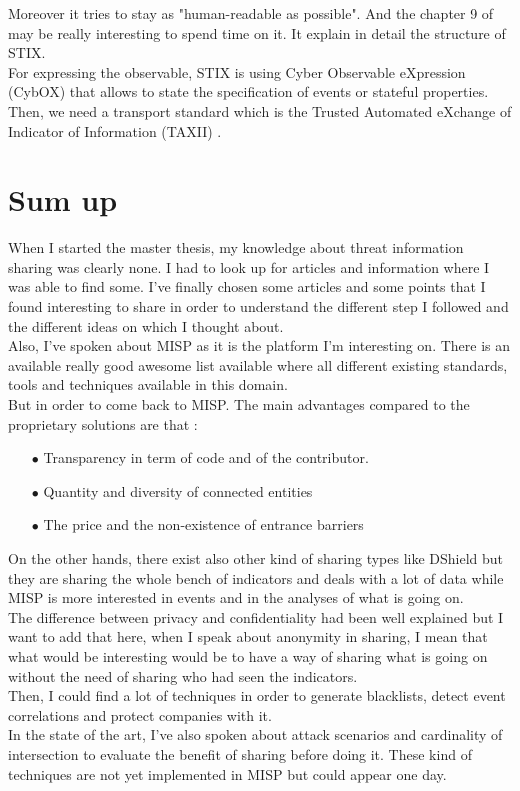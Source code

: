 \documentclass{eplmastersthesis}
\begin{document}
 Moreover it tries to stay as "human-readable as possible". And the chapter 9 of \cite{barnum2012standardizing} may be really interesting to spend time on it. It explain in detail the structure of STIX.\\
 For expressing the observable, STIX is using Cyber Observable eXpression (CybOX)\cite{barnum2012cybox} that allows to state the specification of events or stateful properties.
Then, we need a transport standard which is the Trusted Automated eXchange of Indicator of Information (TAXII) \cite{connolly2014trusted} .

\section{Sum up}
When I started the master thesis, my knowledge about threat information sharing was clearly none. I had to look up for articles and information where I was able to find some. I've finally chosen some articles and some points that I found interesting to share in order to understand the different step I followed and the different ideas on which I thought about.\\
Also, I've spoken about MISP as it is the platform I'm interesting on. There is an available really good awesome list \cite{AwesomeTreat} available where all different existing standards, tools and techniques available in this domain.\\
But in order to come back to MISP. The main advantages compared to the proprietary solutions are that :
\begin{itemize}
\item[$\bullet$] Transparency in term of code and of the contributor.
\item[$\bullet$] Quantity and diversity of connected entities
\item[$\bullet$] The price and the non-existence of entrance barriers
\end{itemize}
On the other hands, there exist also other kind of sharing types like DShield but they are sharing the whole bench of indicators and deals with a lot of data while MISP is more interested in events and in the analyses of what is going on.\\

The difference between privacy and confidentiality had been well explained but I want to add that here, when I speak about anonymity in sharing, I mean that what would be interesting would be to have a way of sharing what is going on without the need of sharing who had seen the indicators.\\
Then, I could find a lot of techniques in order to generate blacklists, detect event correlations and protect companies with it.\\
In the state of the art, I've also spoken about attack scenarios and cardinality of intersection to evaluate the benefit of sharing before doing it. These kind of techniques are not yet implemented in MISP but could appear one day.\\
\end{document}
